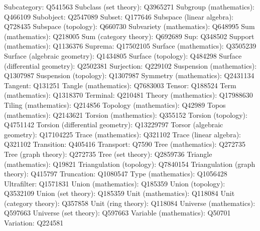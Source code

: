 Subcategory: Q541563
Subclass (set theory): Q3965271
Subgroup (mathematics): Q466109
Subobject: Q2547089
Subset: Q177646
Subspace (linear algebra): Q728435
Subspace (topology): Q660730
Subvariety (mathematics): Q648995
Sum (mathematics): Q218005
Sum (category theory): Q692689
Sup: Q348502
Support (mathematics): Q1136376
Suprema: Q17502105
Surface (mathematics): Q3505239
Surface (algebraic geometry): Q1434805
Surface (topology): Q484298
Surface (differential geometry): Q2502381
Surjection: Q229102
Suspension (mathematics): Q1307987
Suspension (topology): Q1307987
Symmetry (mathematics): Q2431134
Tangent: Q131251
Tangle (mathematics): Q7683003
Tensor: Q188524
Term (mathematics): Q1318370
Terminal: Q210481
Theory (mathematics): Q17988630
Tiling (mathematics): Q214856
Topology (mathematics): Q42989
Topos (mathematics): Q2143621
Torsion (mathematics): Q355152
Torsion (topology): Q4751142
Torsion (differential geometry): Q13229797
Torsor (algebraic geometry): Q17104225
Trace (mathematics): Q321102
Trace (linear algebra): Q321102
Transition: Q405416
Transport: Q7590
Tree (mathematics): Q272735
Tree (graph theory): Q272735
Tree (set theory): Q2859736
Triangle (mathematics): Q19821
Triangulation (topology): Q7840154
Triangulation (graph theory): Q415797
Truncation: Q1080547
Type (mathematics): Q1056428
Ultrafilter: Q1571831
Union (mathematics): Q185359
Union (topology): Q3532109
Union (set theory): Q185359
Unit (mathematics): Q118084
Unit (category theory): Q357858
Unit (ring theory): Q118084
Universe (mathematics): Q597663
Universe (set theory): Q597663
Variable (mathematics): Q50701
Variation: Q224581
